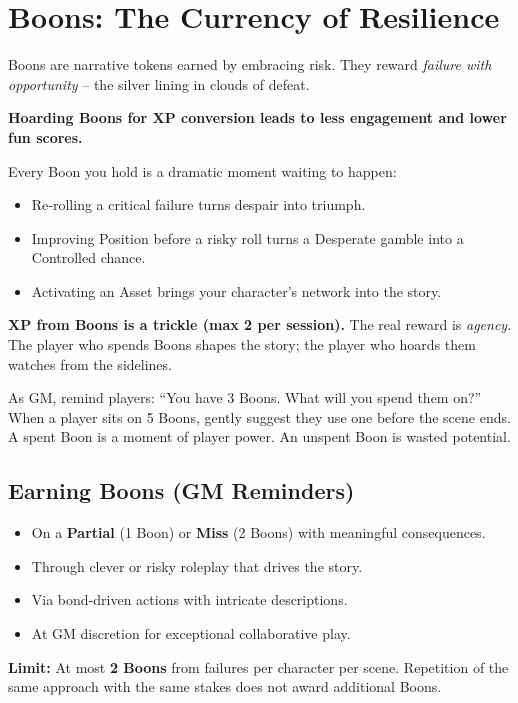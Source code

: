 \section{Boons: The Currency of Resilience}
\label{sec:boons-gm}

Boons are narrative tokens earned by embracing risk. They reward \textit{failure with opportunity} – the silver lining in clouds of defeat.

\begin{tcolorbox}[colback=yellow!5!white, colframe=yellow!75!black, title={Why You Should Spend Boons – The Math of Fun}]
\textbf{Hoarding Boons for XP conversion leads to less engagement and lower fun scores.}

\medskip
\noindent Every Boon you hold is a dramatic moment waiting to happen:
\begin{itemize}
  \item Re‑rolling a critical failure turns despair into triumph.
  \item Improving Position before a risky roll turns a Desperate gamble into a Controlled chance.
  \item Activating an Asset brings your character’s network into the story.
\end{itemize}
\textbf{XP from Boons is a trickle (max 2 per session).} The real reward is \textit{agency}. The player who spends Boons shapes the story; the player who hoards them watches from the sidelines.

\medskip
\noindent As GM, remind players: “You have 3 Boons. What will you spend them on?” When a player sits on 5 Boons, gently suggest they use one before the scene ends. A spent Boon is a moment of player power. An unspent Boon is wasted potential.
\end{tcolorbox}

\subsection{Earning Boons (GM Reminders)}
\label{subsec:boons-earn}

\begin{itemize}
  \item On a \textbf{Partial} (1 Boon) or \textbf{Miss} (2 Boons) with meaningful consequences.
  \item Through clever or risky roleplay that drives the story.
  \item Via bond‑driven actions with intricate descriptions.
  \item At GM discretion for exceptional collaborative play.
\end{itemize}
\textbf{Limit:} At most \textbf{2 Boons} from failures per character per scene. Repetition of the same approach with the same stakes does not award additional Boons.

